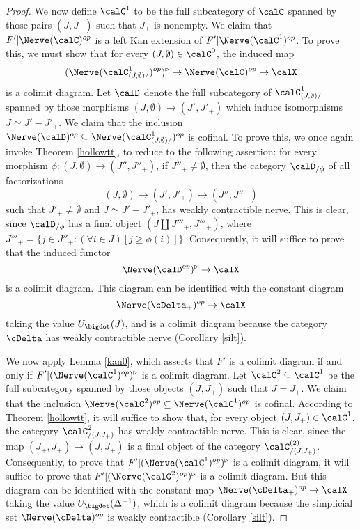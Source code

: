 \begin{proof}
We now define $\calC^{1}$ to be the full subcategory of $\calC$ spanned by those pairs
$(J,J_{+})$ such that $J_{+}$ is nonempty. We claim that $F' | \Nerve(\calC)^{op}$ is a left Kan extension of $F' | \Nerve (\calC^{1})^{op}$. To prove this, we must show that for every
$(J, \emptyset) \in \calC^{0}$, the induced map
$$ (\Nerve (\calC^{1}_{(J, \emptyset)/} )^{op} )^{\triangleright} \rightarrow \Nerve(\calC)^{op}
\rightarrow \calX$$
is a colimit diagram. Let $\calD$ denote the full subcategory of
$\calC^{1}_{(J, \emptyset)/}$ spanned by those morphisms $(J, \emptyset) \rightarrow
(J' , J'_{+} )$ which induce isomorphisms $J \simeq J' - J'_{+}$. We claim that the inclusion
$\Nerve(\calD)^{op} \subseteq \Nerve ( \calC^{1}_{(J, \emptyset)/} )^{op}$ is cofinal.
To prove this, we once again invoke Theorem \ref{hollowtt}, to reduce to the following assertion:
for every morphism $\phi: (J, \emptyset) \rightarrow (J'', J''_{+})$, if $J''_{+} \neq \emptyset$, then the category $\calD_{/\phi}$ of all factorizations
$$ (J, \emptyset) \rightarrow (J', J'_{+}) \rightarrow (J'', J''_{+}) $$ 
such that $J'_{+} \neq \emptyset$ and $J \simeq J' - J'_{+}$, has weakly contractible nerve.
This is clear, since $\calD_{/\phi}$ has a final object $(J \amalg J'''_{+}, J'''_{+})$, where
$J'''_{+} = \{ j \in J''_{+}: (\forall i \in J) [ j \geq \phi(i) ] \}$. Consequently, it will suffice to prove that the induced functor
$$ \Nerve(\calD^{op})^{\triangleright} \rightarrow \calX$$
is a colimit diagram. This diagram can be identified with the constant diagram
$$ \Nerve(\cDelta_{+})^{op} \rightarrow \calX$$ taking the value $U_{\bigdot}(J)$, and
is a colimit diagram because the category $\cDelta$ has weakly contractible nerve (Corollary \ref{silt}).

We now apply Lemma \ref{kan0}, which asserts that $F'$ is a colimit diagram if and only if
$F' | (\Nerve (\calC^{1})^{op})^{\triangleright}$ is a colimit diagram.
Let $\calC^{2} \subseteq \calC^{1}$ be the full subcategory spanned by those objects
$(J, J_{+})$ such that $J = J_{+}$. We claim that the inclusion
$\Nerve(\calC^{2})^{op} \subseteq \Nerve(\calC^{1})^{op}$ is cofinal. According to Theorem
\ref{hollowtt}, it will suffice to show that, for every object $(J, J_+) \in \calC^{1}$, the
category $\calC^{2}_{/(J, J_{+})}$ has weakly contractible nerve. This is clear,
since the map $(J_{+}, J_{+}) \rightarrow (J, J_{+})$ is a final object of 
the category $\calC^{(2)}_{/(J,J_{+})}$. Consequently, to prove that
$F' | (\Nerve (\calC^{1})^{op})^{\triangleright}$ is a colimit diagram, it will suffice to prove that
$F' | ( \Nerve (\calC^{2})^{op})^{\triangleright}$ is a colimit diagram. But this diagram can be identified with the constant map $\Nerve(\cDelta_{+})^{op} \rightarrow \calX$ taking the value
$U_{\bigdot}( \Delta^{-1})$, which is a colimit diagram because the simplicial set
$\Nerve(\cDelta)^{op}$ is weakly contractible (Corollary \ref{silt}). 
\end{proof}

